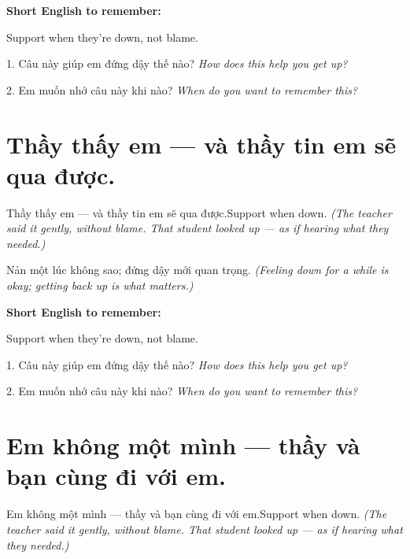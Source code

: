 \begin{ghinhoanh}
\textbf{Short English to remember:}

Support when they're down, not blame.

\end{ghinhoanh}

\begin{tuhocnhanh}
1. Câu này giúp em đứng dậy thế nào? \textit{How does this help you get up?}

2. Em muốn nhớ câu này khi nào? \textit{When do you want to remember this?}
\end{tuhocnhanh}
\ngancach


\section{Thầy thấy em — và thầy tin em sẽ qua được.}
\begin{truyen}{Thầy thấy em — và thầy tin em sẽ qua được.}{Support when down.}
\textit{(The teacher said it gently, without blame. That student looked up — as if hearing what they needed.)}
\end{truyen}

\begin{baihoc}
Nản một lúc không sao; đứng dậy mới quan trọng.
\textit{(Feeling down for a while is okay; getting back up is what matters.)}
\end{baihoc}

\begin{ghinhoanh}
\textbf{Short English to remember:}

Support when they're down, not blame.

\end{ghinhoanh}

\begin{tuhocnhanh}
1. Câu này giúp em đứng dậy thế nào? \textit{How does this help you get up?}

2. Em muốn nhớ câu này khi nào? \textit{When do you want to remember this?}
\end{tuhocnhanh}
\ngancach


\section{Em không một mình — thầy và bạn cùng đi với em.}
\begin{truyen}{Em không một mình — thầy và bạn cùng đi với em.}{Support when down.}
\textit{(The teacher said it gently, without blame. That student looked up — as if hearing what they needed.)}
\end{truyen}

